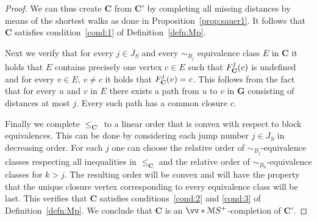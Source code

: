 \documentclass{elsarticle}
\def\ordclasssup#1#2{\vv*{#1}{#2}}
\def\str#1{\mathbf {#1}}
\def\func#1#2{\nbfunc{\ifstrempty{#1}{}{\str{#1}}}{#2}}
\def\nbfunc#1#2{F\ifstrempty{#1}{}{_{#1}}\ifstrempty{#2}{}{^{#2}}}
\theoremstyle{plain}
\theoremstyle{definition}
\theoremstyle{remark}
\begin{document}
\begin{proof}
We can thus create $\str{C}$ from $\str{C}'$ by completing all missing distances by means of the shortest walks as done in Proposition~\ref{prop:sauer1}.
It follows that $\str{C}$ satisfies condition~\ref{cond:1} of Definition~\ref{defn:Mp}.

\medskip

Next we verify that for every $j\in J_S$ and every $\sim_{B_j}$ equivalence class $E$ in $\str{C}$ it holds that $E$ contains precisely one vertex $c\in E$ such that $\func{C}{j}(c)$ is undefined and for every $v\in E$, $v\neq c$ it holds that $\func{C}{j}(v)=c$. This follows from the fact that for every $u$ and $v$ in $E$ there exists a path from $u$ to $v$ in $\str{G}$ consisting of distances at most $j$. Every such path has a common closure $c$.

Finally we complete $\leq_{\str{C}'}$ to a linear order that is convex with respect to block equivalences.
This can be done by considering each jump number $j\in J_S$ in decreasing order.  For each $j$ one can choose the relative order of $\sim_{B_j}$-equivalence classes respecting all inequalities in $\leq_\str{C}$ and the relative order of $\sim_{B_k}$-equivalence classes for $k>j$.  The resulting order will be convex and will have the property that the unique closure vertex corresponding to every equivalence class will be last.
This verifies that $\str{C}$ satisfies conditions~\ref{cond:2} and \ref{cond:3} of Definition~\ref{defn:Mp}.
We conclude that $\str{C}$ is an $\ordclasssup{\mathcal M}{S}^+$-completion of $\str{C}'$.
\end{proof}
\end{document}
